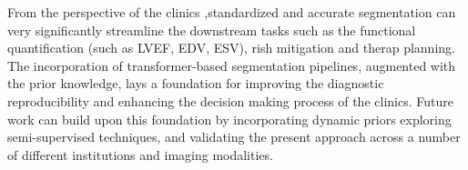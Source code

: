 From the perspective of the clinics ,standardized and accurate segmentation can very significantly streamline the downstream tasks such as the functional quantification (such as LVEF, EDV, ESV), rish mitigation and therap planning. The incorporation of transformer-based segmentation pipelines, augmented with the prior knowledge, lays a foundation for improving the diagnostic reproducibility and enhancing the decision making process of the clinics. Future work can build upon this foundation by incorporating dynamic priors exploring semi-supervised techniques, and validating the present approach across a number of different institutions and imaging modalities.

